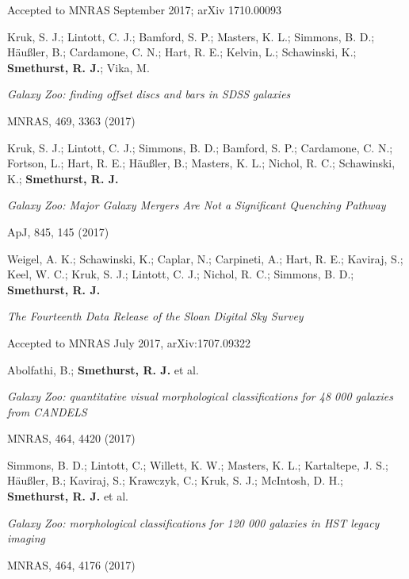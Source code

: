 \documentclass{article}
\begin{document}
\indent \indent Accepted to MNRAS September 2017; arXiv 1710.00093

\hangindent=30pt \indent \indent Kruk, S. J.; Lintott, C. J.; Bamford, S. P.; Masters, K. L.; Simmons, B. D.; Häußler, B.; Cardamone, C. N.; Hart, R. E.; Kelvin, L.; Schawinski, K.; {\bf Smethurst, R. J.}; Vika, M.

\medskip


\hangindent=15pt \indent \emph{Galaxy Zoo: finding offset discs and bars in SDSS galaxies}

\indent \indent MNRAS, 469, 3363 (2017)

\hangindent=30pt \indent \indent Kruk, S. J.; Lintott, C. J.; Simmons, B. D.; Bamford, S. P.; Cardamone, C. N.; Fortson, L.; Hart, R. E.; Häußler, B.; Masters, K. L.; Nichol, R. C.; Schawinski, K.; {\bf Smethurst, R. J.}

\medskip 

\hangindent=15pt \indent \emph{Galaxy Zoo: Major Galaxy Mergers Are Not a Significant Quenching Pathway}

\indent \indent ApJ, 845, 145 (2017)

\hangindent=30pt \indent \indent Weigel, A. K.; Schawinski, K.; Caplar, N.; Carpineti, A.; Hart, R. E.; Kaviraj, S.; Keel, W. C.; Kruk, S. J.; Lintott, C. J.; Nichol, R. C.; Simmons, B. D.; {\bf Smethurst, R. J.}

\medskip

\hangindent=15pt \indent \emph{The Fourteenth Data Release of the Sloan Digital Sky Survey}

\indent \indent Accepted to MNRAS July 2017, arXiv:1707.09322

\hangindent=30pt \indent \indent Abolfathi, B.; {\bf Smethurst, R. J.} et al. 

\medskip

\hangindent=15pt \indent \emph{Galaxy Zoo: quantitative visual morphological classifications for 48 000 galaxies from CANDELS}

\indent \indent MNRAS, 464, 4420 (2017)

\hangindent=30pt \indent \indent Simmons, B. D.; Lintott, C.; Willett, K. W.; Masters, K. L.; Kartaltepe, J. S.; Häußler, B.; Kaviraj, S.; Krawczyk, C.; Kruk, S. J.; McIntosh, D. H.; {\bf Smethurst, R. J.} et al. 

\medskip

\hangindent=15pt \indent \emph{Galaxy Zoo: morphological classifications for 120 000 galaxies in HST legacy imaging}

\indent \indent MNRAS, 464, 4176 (2017)
\end{document}
